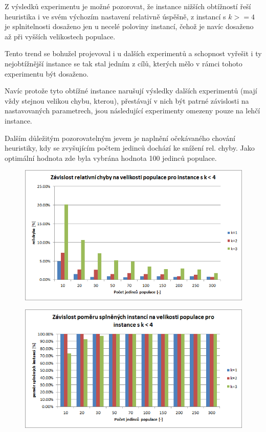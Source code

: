 \documentclass[12pt,oneside,a4paper]{article}
\begin{document}
Z výsledků experimentu je možné pozorovat, že instance nižších obtížností řeší heuristika i ve svém výchozím nastavení relativně úspěšně, z instancí s $k>=4$ je splnitelnosti dosaženo jen u necelé poloviny instancí, čehož je navíc dosaženo až při vyšších velikostech populace.

Tento trend se bohužel projevoval i u dalších experimentů a schopnost vyřešit i ty nejobtížnější instance se tak stal jedním z cílů, kterých mělo v rámci tohoto experimentu být dosaženo. 

Navíc protože tyto obtížné instance narušují výsledky dalších experimentů (mají vždy stejnou velikou chybu, kterou), přestávají v nich být patrné závislosti na nastavovaných parametrech, jsou následující experimenty omezeny pouze na lehčí instance.

Dalším důležitým pozorovatelným jevem je naplnění očekávaného chování heuristiky, kdy se zvyšujícím počtem jedinců dochází ke snížení rel. chyby. Jako optimální hodnota zde byla vybrána hodnota 100 jedinců populace.

\begin{figure}[ht]
\centering
\includegraphics[scale=0.75]{obr/pop-size-err-min.png}
\end{figure}


\begin{figure}[ht]
\centering
\includegraphics[scale=0.75]{obr/pop-size-sat-min.png}
\end{figure}
\end{document}
